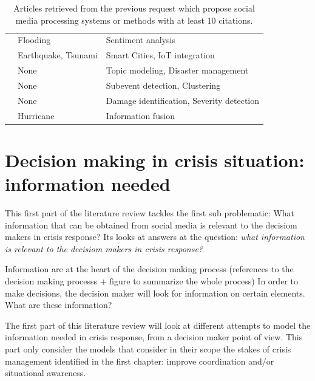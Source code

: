\begin{table}[bp]
\begin{tabular}{m{} m{} m{}}
        \cite{raginiBigDataAnalytics2018a}               & Flooding              & Sentiment analysis                                       \\
        \cite{shahDisasterResilientSmart2019a}           & Earthquake, Tsunami   & Smart Cities, IoT integration                            \\
        \cite{grunder-fahrerTopicsTopicalPhases2018a}    & None                  & Topic modeling, Disaster management                      \\
        \cite{wuStreamExplorerMultiStageSystem2018a}     & None                  & Subevent detection, Clustering                           \\
        \cite{agarwalCrisisDIASMultimodalDamage2020a}    & None                  & Damage identification, Severity detection                \\
        \cite{alamDescriptiveVisualSummaries2020a}       & Hurricane             & Information fusion                                       \\
        \bottomrule
    \end{tabular}
    \caption{Articles retrieved from the previous request which propose social media processing systems or methods with at least 10 citations.}
    \label{table:crisis-informatic-main-articles}
\end{table}


\section{Decision making in crisis situation: information needed}
This first part of the literature review tackles the first sub problematic: What information that can be obtained from social media is relevant to the decisiom makers in crisis response?
Its looks at answers at the question: \emph{what information is relevant to the decisiom makers in crisis response?}

Information are at the heart of the decision making process (references to the decision making processs + figure to summarize the whole process)
In order to make decisions, the decision maker will look for information on certain elements.
What are these information?

The first part of this literature review will look at different attempts to model the information needed in crisis response, from a decision maker point of view.
This part only consider the models that consider in their scope the stakes of crisis management identified in the first chapter: improve coordination and/or situational awareness.

